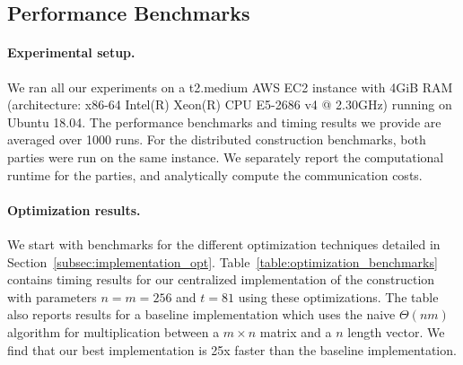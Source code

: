 
\subsection{Performance Benchmarks}
\label{subsec:performance}
\paragraph{Experimental setup.}
We ran all our experiments on a t2.medium AWS EC2 instance with 4GiB RAM (architecture: x86-64 Intel(R) Xeon(R) CPU E5-2686 v4 @ 2.30GHz) running on Ubuntu 18.04. The performance benchmarks and timing results we provide are averaged over 1000 runs. For the distributed construction benchmarks, both parties were run on the same instance. We separately report the computational runtime for the parties, and analytically compute the communication costs. 


\paragraph{Optimization results.}
We start with benchmarks for the different optimization techniques detailed in Section~\ref{subsec:implementation_opt}. Table~\ref{table:optimization_benchmarks} contains timing results for our centralized implementation of the \ttwPRF construction with parameters $n=m=256$ and $t=81$ using these optimizations. The table also reports results for a baseline implementation which uses the naive $\Theta(nm)$ algorithm for multiplication between a $m \times n$ matrix and a $n$ length vector. We find that our best implementation is 25x faster than the baseline implementation.


